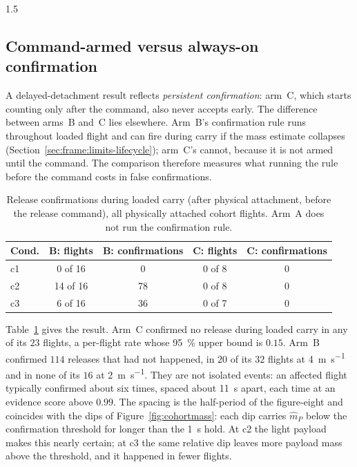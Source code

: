 \begin{spacing}{1.5}
\subsection{Command-armed versus always-on confirmation}\label{sec:eval:unsignaled}

A delayed-detachment result reflects \emph{persistent confirmation}: arm~C,
which starts counting only after the command, also never accepts early. The
difference between arms~B and~C lies elsewhere. Arm~B's confirmation rule runs
throughout loaded flight and can fire during carry if the mass estimate
collapses (Section~\ref{sec:frame:limits-lifecycle}); arm~C's cannot, because it
is not armed until the command. The comparison therefore measures what running
the rule before the command costs in false confirmations.

\begin{table}[ht]
\centering
\caption[Release confirmations during loaded carry]{Release confirmations during loaded carry (after physical attachment,
before the release command), all physically attached cohort flights.
Arm~A does not run the confirmation rule.}
\label{tab:carryconf}
\small
\begin{tabular}{@{}l c c c c@{}}
\toprule
\textbf{Cond.} & \textbf{B: flights} & \textbf{B: confirmations} &
\textbf{C: flights} & \textbf{C: confirmations} \\
\midrule
c1 & 0 of 16 & 0 & 0 of 8 & 0 \\
c2 & 14 of 16 & 78 & 0 of 8 & 0 \\
c3 & 6 of 16 & 36 & 0 of 7 & 0 \\
\bottomrule
\end{tabular}
\end{table}

Table~\ref{tab:carryconf} gives the result. Arm~C confirmed no release during
loaded carry in any of its $23$ flights, a per-flight rate whose
\SI{95}{\percent} upper bound is $0.15$. Arm~B confirmed $114$ releases that had
not happened, in $20$ of its $32$ flights at \SI{4}{\meter\per\second} and in
none of its $16$ at \SI{2}{\meter\per\second}. They are not isolated events: an
affected flight typically confirmed about six times, spaced about \SI{11}{\second}
apart, each time at an evidence score above $0.99$. The spacing is the half-period of
the figure-eight and coincides with the dips of Figure~\ref{fig:cohortmass}: each
dip carries $\hat m_P$ below the confirmation threshold for longer than the
\SI{1}{\second} hold. At c2 the light payload makes this nearly certain; at c3 the
same relative dip leaves more payload mass above the threshold, and it happened
in fewer flights.


\end{spacing}

